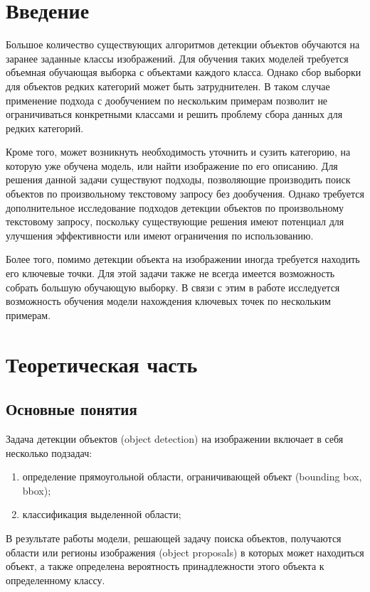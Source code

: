 \documentclass[a4paper,14pt]{article}
\begin{document}
    \tableofcontents
    \pagebreak

    \section*{Введение}

    Большое количество существующих алгоритмов детекции объектов обучаются на заранее заданные классы изображений.
    Для обучения таких моделей требуется объемная обучающая выборка с объектами каждого класса.
    Однако сбор выборки для объектов редких категорий может быть затруднителен.
    В таком случае применение подхода с дообучением по нескольким примерам позволит не ограничиваться конкретными классами и решить проблему сбора данных для редких категорий.

    Кроме того, может возникнуть необходимость уточнить и сузить категорию, на которую уже обучена модель, или найти изображение по его описанию.
    Для решения данной задачи существуют подходы, позволяющие производить поиск объектов по произвольному текстовому запросу без дообучения.
    Однако требуется дополнительное исследование подходов детекции объектов по произвольному текстовому запросу, поскольку существующие решения имеют потенциал для улучшения эффективности или имеют ограничения по использованию.

    Более того, помимо детекции объекта на изображении иногда требуется находить его ключевые точки.
    Для этой задачи также не всегда имеется возможность собрать большую обучающую выборку.
    В связи с этим в работе исследуется возможность обучения модели нахождения ключевых точек по нескольким примерам.

    \newpage


    \section{Теоретическая часть}

    \subsection{Основные понятия}

    Задача детекции объектов (object detection) на изображении включает в себя несколько подзадач:
    \begin{enumerate}
        [1)]
        \itemsep0em
        \item определение прямоугольной области, ограничивающей объект (bounding box, bbox);
        \item классификация выделенной области;
    \end{enumerate}
    В результате работы модели, решающей задачу поиска объектов, получаются области или регионы изображения (object proposals) в которых может находиться объект, а также определена вероятность принадлежности этого объекта к определенному классу.
\end{document}
